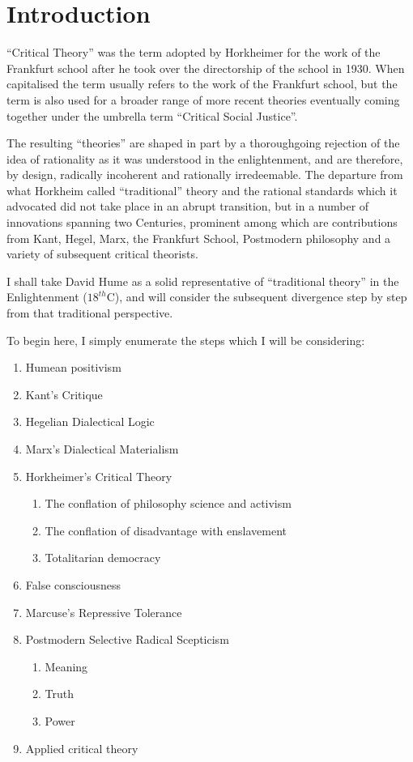 \documentclass[10pt,titlepage]{article}
\begin{document}
\section{Introduction}

``Critical Theory'' was the term adopted by Horkheimer \cite{horkheimer-trad, horkheimer-crit} for the work of the Frankfurt school after he took over the directorship of the school in 1930.
When capitalised the term usually refers to the work of the Frankfurt school, but the term is also used for a broader range of more recent theories eventually coming together under the umbrella term ``Critical Social Justice''.

The resulting ``theories'' are shaped in part by a thoroughgoing rejection of the idea of rationality as it was understood in the enlightenment, and are therefore, by design, radically incoherent and rationally irredeemable.
The departure from what Horkheim called ``traditional'' theory and the rational standards which it advocated did not take place in an abrupt transition, but in a number of innovations spanning two Centuries, prominent among which are contributions from Kant, Hegel, Marx, the Frankfurt School, Postmodern philosophy and a variety of subsequent critical theorists.

I shall take David Hume as a solid representative of ``traditional theory'' in the Enlightenment ($18^{th}$C), and will consider the subsequent divergence step by step from that traditional perspective.

To begin here, I simply enumerate the steps which I will be considering:

\begin{enumerate}
  \item Humean positivism
\item Kant's Critique
\item Hegelian Dialectical Logic
\item Marx's Dialectical Materialism
\item Horkheimer's Critical Theory
  \begin{enumerate}
  \item The conflation of philosophy science and activism
  \item The conflation of disadvantage with enslavement
  \item Totalitarian democracy
  \end{enumerate}
  \item False consciousness
\item Marcuse's Repressive Tolerance
\item Postmodern Selective Radical Scepticism
  \begin{enumerate}
  \item Meaning
  \item Truth
  \item Power
    \end{enumerate}
\item Applied critical theory
\end{enumerate}
\end{document}
